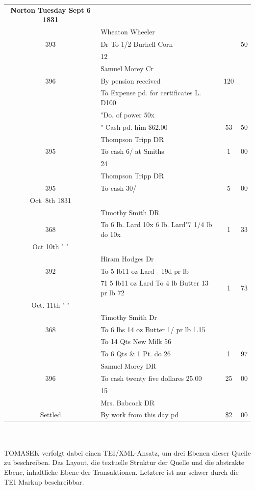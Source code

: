 \documentclass[12pt,a4paper]{article}
\begin{document}
\begin{tabular}{clcc}
 \textbf{Norton Tuesday Sept 6 1831}\\
    & Wheaton Wheeler & &\\
393 & Dr To 1/2 Burhell Corn & & 50 \\
    & 12 & &\\
    & Samuel Morey  Cr  & &\\
396 & By pension received & 120 & \\
    & To Expense pd. for certificates L. D100 & &\\
    & "Do. of power 50x & &\\
    & " Cash pd. him \$62.00 & 53 & 50\\
    & Thompson Tripp  DR  & &\\
395 & To cash 6/ at Smiths & 1 & 00\\	
    & 24 & &\\
    & Thompson Tripp  DR & &\\	
395 & To cash 30/ & 5  & 00\\		
Oct. 8th 1831\\
    & Timothy Smith DR & &\\
368 & To 6 lb. Lard 10x 6 lb. Lard"7 1/4 lb do 10x & 1 & 33 \\
Oct 10th " "\\
    & Hiram Hodges Dr & &\\
392 & To 5 lb11 oz Lard - 19d pr lb\\
    & 71 5 lb11 oz Lard To 4 lb Butter 13 pr lb 72 & 1 & 73\\
Oct. 11th " "\\
    & Timothy Smith  Dr& &\\
368 & To 6 lbs 14 oz Butter 1/ pr lb 1.15 & & \\ & To 14 Qts New Milk 56 & &\\
& To 6 Qts \& 1 Pt. do 26 & 1 & 97 	\\	
    & Samuel Morey DR & &\\
396 & To cash twenty five dollares 25.00 & 25 & 00\\
    & 15 & & \\	
    & Mrs. Babcock DR  & & \\		
Settled & By work from this day pd & \$2 & 00
\end{tabular}
\\
\\
TOMASEK verfolgt dabei einen TEI/XML-Ansatz, um drei Ebenen dieser Quelle zu beschreiben. Das Layout, die textuelle Struktur der Quelle und die abstrakte Ebene, inhaltliche Ebene der Transaktionen. Letztere ist nur schwer durch die TEI Markup beschreibbar.
\end{document}
